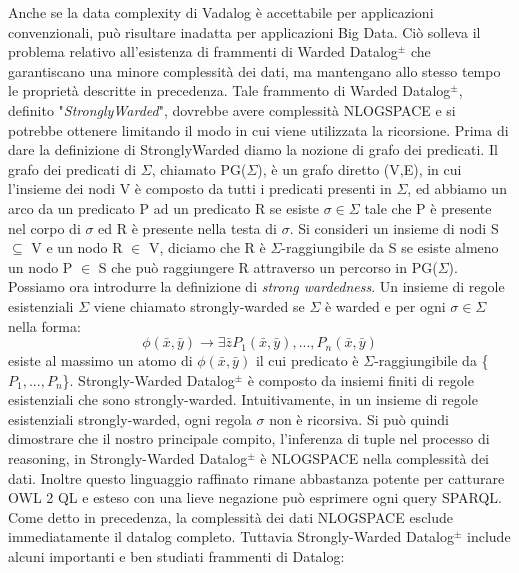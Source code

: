 Anche se la data complexity di Vadalog è accettabile per applicazioni convenzionali, può risultare inadatta per applicazioni Big Data. \newline
Ciò solleva il problema relativo all'esistenza di frammenti di Warded Datalog$^\pm$ che garantiscano una minore complessità dei dati, ma mantengano allo stesso tempo le proprietà descritte in precedenza. \newline
Tale frammento di Warded Datalog$^\pm$, definito "\emph{StronglyWarded}", dovrebbe avere complessità NLOGSPACE e si potrebbe ottenere limitando il modo in cui viene utilizzata la ricorsione. Prima di dare la definizione di StronglyWarded diamo la nozione di grafo dei predicati. \newline
Il grafo dei predicati di $\Sigma$, chiamato PG($\Sigma$), è un grafo diretto (V,E), in cui l'insieme dei nodi V è composto da tutti i predicati presenti in $\Sigma$, ed abbiamo un arco da un predicato P ad un predicato R se esiste $\sigma \in \Sigma$ tale che P è presente nel corpo di $\sigma$ ed R è presente nella testa di $\sigma$. Si consideri un insieme di nodi S $\subseteq$ V e un nodo R $\in$ V, diciamo che R è $\Sigma$-raggiungibile da S se esiste almeno un nodo P $\in$ S che può raggiungere R attraverso un percorso in PG($\Sigma$). \newline
Possiamo ora introdurre la definizione di \emph{strong wardedness}. Un insieme di regole esistenziali $\Sigma$ viene chiamato strongly-warded se $\Sigma$ è warded e per ogni $\sigma \in \Sigma$ nella forma: \[\phi(\bar{x}, \bar{y}) \rightarrow \exists \bar{z} P_{1}(\bar{x}, \bar{y}), ..., P_{n}(\bar{x}, \bar{y})\] esiste al massimo un atomo di $\phi(\bar{x}, \bar{y})$ il cui predicato è $\Sigma$-raggiungibile da \{$P_{1}, ..., P_{n}$\}. \newline
Strongly-Warded Datalog$^\pm$ è composto da insiemi finiti di regole esistenziali che sono strongly-warded. Intuitivamente, in un insieme di regole esistenziali strongly-warded, ogni regola $\sigma$ non è ricorsiva. Si può quindi dimostrare che il nostro principale compito, l'inferenza di tuple nel processo di reasoning, in Strongly-Warded Datalog$^\pm$ è NLOGSPACE nella complessità dei dati. Inoltre questo linguaggio raffinato rimane abbastanza potente per catturare OWL 2 QL e esteso con una lieve negazione può esprimere ogni query SPARQL. \newline
Come detto in precedenza, la complessità dei dati NLOGSPACE esclude immediatamente il datalog completo. Tuttavia Strongly-Warded Datalog$^\pm$ include alcuni importanti e ben studiati frammenti di Datalog:
